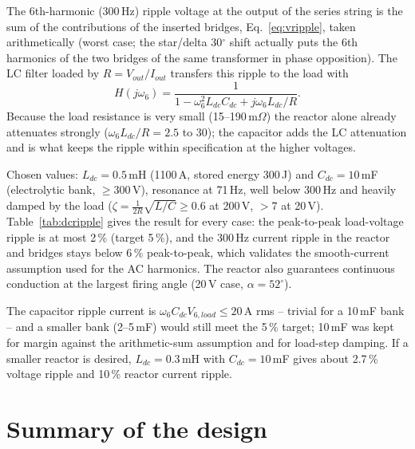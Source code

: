 \documentclass[11pt,a4paper]{article}
\begin{document}
The 6th-harmonic (300\,Hz) ripple voltage at the output of the series string is the sum of the contributions of the inserted bridges, Eq.~\eqref{eq:vripple}, taken arithmetically (worst case; the star/delta 30$^\circ$ shift actually puts the 6th harmonics of the two bridges of the same transformer in phase opposition). The LC filter loaded by $R = V_{out}/I_{out}$ transfers this ripple to the load with
\begin{equation}
H(j\omega_6) = \frac{1}{1 - \omega_6^2 L_{dc}C_{dc} + j\omega_6 L_{dc}/R}.
\end{equation}
Because the load resistance is very small (15--190\,m$\Omega$) the reactor alone already attenuates strongly ($\omega_6 L_{dc}/R = 2.5$ to 30); the capacitor adds the LC attenuation and is what keeps the ripple within specification at the higher voltages.

Chosen values: $L_{dc} = 0.5$\,mH (1100\,A, stored energy 300\,J) and $C_{dc} = 10$\,mF (electrolytic bank, $\ge 300$\,V), resonance at 71\,Hz, well below 300\,Hz and heavily damped by the load ($\zeta = \tfrac{1}{2R}\sqrt{L/C} \ge 0.6$ at 200\,V, $> 7$ at 20\,V). Table~\ref{tab:dcripple} gives the result for every case: the peak-to-peak load-voltage ripple is at most 2\,\% (target 5\,\%), and the 300\,Hz current ripple in the reactor and bridges stays below 6\,\% peak-to-peak, which validates the smooth-current assumption used for the AC harmonics. The reactor also guarantees continuous conduction at the largest firing angle (20\,V case, $\alpha = 52^\circ$).

\begin{table}[h]
\centering
\small

\caption{DC-side 6th-harmonic ripple with $L_{dc} = 0.5$\,mH, $C_{dc} = 10$\,mF. $V_6$ bridge is the worst-case sum of the inserted bridges.}
\label{tab:dcripple}
\end{table}

The capacitor ripple current is $\omega_6 C_{dc} V_{6,load} \le 20$\,A rms -- trivial for a 10\,mF bank -- and a smaller bank (2--5\,mF) would still meet the 5\,\% target; 10\,mF was kept for margin against the arithmetic-sum assumption and for load-step damping. If a smaller reactor is desired, $L_{dc} = 0.3$\,mH with $C_{dc} = 10$\,mF gives about 2.7\,\% voltage ripple and 10\,\% reactor current ripple.

\section{Summary of the design}
\end{document}
